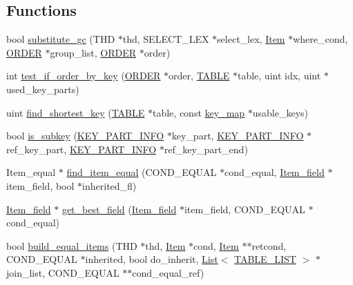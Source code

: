 \subsection*{Functions}
\begin{DoxyCompactItemize}
\item 
bool \mbox{\hyperlink{group__Query__Optimizer_gaa95a062cdd785687a638e01d7ad85d11}{substitute\+\_\+gc}} (T\+HD $\ast$thd, S\+E\+L\+E\+C\+T\+\_\+\+L\+EX $\ast$select\+\_\+lex, \mbox{\hyperlink{classItem}{Item}} $\ast$where\+\_\+cond, \mbox{\hyperlink{structst__order}{O\+R\+D\+ER}} $\ast$group\+\_\+list, \mbox{\hyperlink{structst__order}{O\+R\+D\+ER}} $\ast$order)
\item 
int \mbox{\hyperlink{group__Query__Optimizer_ga96dc524565684a4e258c98f5b7fd1541}{test\+\_\+if\+\_\+order\+\_\+by\+\_\+key}} (\mbox{\hyperlink{structst__order}{O\+R\+D\+ER}} $\ast$order, \mbox{\hyperlink{structTABLE}{T\+A\+B\+LE}} $\ast$table, uint idx, uint $\ast$used\+\_\+key\+\_\+parts)
\item 
uint \mbox{\hyperlink{group__Query__Optimizer_gafd0c3fdb07be77d705feaf3f8f51164f}{find\+\_\+shortest\+\_\+key}} (\mbox{\hyperlink{structTABLE}{T\+A\+B\+LE}} $\ast$table, const \mbox{\hyperlink{classBitmap_3_0164_01_4}{key\+\_\+map}} $\ast$usable\+\_\+keys)
\item 
bool \mbox{\hyperlink{group__Query__Optimizer_ga4a8d854a364ab749539a9363619acf99}{is\+\_\+subkey}} (\mbox{\hyperlink{classKEY__PART__INFO}{K\+E\+Y\+\_\+\+P\+A\+R\+T\+\_\+\+I\+N\+FO}} $\ast$key\+\_\+part, \mbox{\hyperlink{classKEY__PART__INFO}{K\+E\+Y\+\_\+\+P\+A\+R\+T\+\_\+\+I\+N\+FO}} $\ast$ref\+\_\+key\+\_\+part, \mbox{\hyperlink{classKEY__PART__INFO}{K\+E\+Y\+\_\+\+P\+A\+R\+T\+\_\+\+I\+N\+FO}} $\ast$ref\+\_\+key\+\_\+part\+\_\+end)
\item 
Item\+\_\+equal $\ast$ \mbox{\hyperlink{group__Query__Optimizer_gafe6fc3febf146805e30ce17267d4dd98}{find\+\_\+item\+\_\+equal}} (C\+O\+N\+D\+\_\+\+E\+Q\+U\+AL $\ast$cond\+\_\+equal, \mbox{\hyperlink{classItem__field}{Item\+\_\+field}} $\ast$item\+\_\+field, bool $\ast$inherited\+\_\+fl)
\item 
\mbox{\hyperlink{classItem__field}{Item\+\_\+field}} $\ast$ \mbox{\hyperlink{group__Query__Optimizer_ga67d1175177356bf1c9b05e9104d28c5b}{get\+\_\+best\+\_\+field}} (\mbox{\hyperlink{classItem__field}{Item\+\_\+field}} $\ast$item\+\_\+field, C\+O\+N\+D\+\_\+\+E\+Q\+U\+AL $\ast$cond\+\_\+equal)
\item 
bool \mbox{\hyperlink{group__Query__Optimizer_ga51f49ad71fa53a75fa8ebae08cf775cc}{build\+\_\+equal\+\_\+items}} (T\+HD $\ast$thd, \mbox{\hyperlink{classItem}{Item}} $\ast$cond, \mbox{\hyperlink{classItem}{Item}} $\ast$$\ast$retcond, C\+O\+N\+D\+\_\+\+E\+Q\+U\+AL $\ast$inherited, bool do\+\_\+inherit, \mbox{\hyperlink{classList}{List}}$<$ \mbox{\hyperlink{structTABLE__LIST}{T\+A\+B\+L\+E\+\_\+\+L\+I\+ST}} $>$ $\ast$join\+\_\+list, C\+O\+N\+D\+\_\+\+E\+Q\+U\+AL $\ast$$\ast$cond\+\_\+equal\+\_\+ref)

\end{DoxyCompactItemize}
